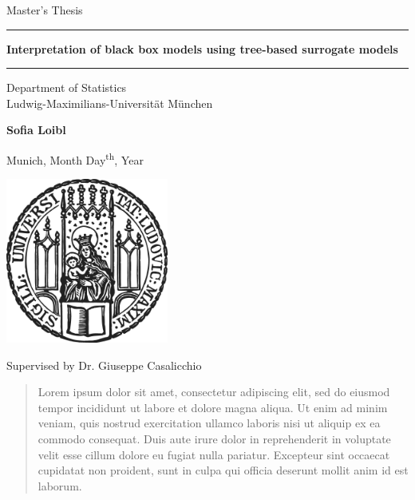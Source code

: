 \documentclass[12pt]{article}
\newcommand{\mytitle}{Interpretation of black box models using tree-based surrogate models}
\newcommand{\myname}{Sofia Loibl}
\newcommand{\mysupervisor}{Dr. Giuseppe Casalicchio}
\begin{document}
 
\begin{titlepage}
\begin{center}
    
\LARGE
Master's Thesis
    
\vspace{0.5cm}
      
\rule{\textwidth}{1.5pt}
\LARGE
\textbf{\mytitle}
\rule{\textwidth}{1.5pt}
   
\vspace{0.5cm}
      
\large
Department of Statistics \\
Ludwig-Maximilians-Universität München 

\vfill

\Large
\textbf{\myname}

\vfill

\large
Munich, Month Day\textsuperscript{th}, Year
      
\vfill

\includegraphics[width = 0.4\textwidth]{sigillum.png}

\vfill

\normalsize
Supervised by \mysupervisor

\end{center}
\end{titlepage}


\newpage

\begin{abstract}

Lorem ipsum dolor sit amet, consectetur adipiscing elit, sed do eiusmod tempor 
incididunt ut labore et dolore magna aliqua. Ut enim ad minim veniam, quis 
nostrud exercitation ullamco laboris nisi ut aliquip ex ea commodo consequat. 
Duis aute irure dolor in reprehenderit in voluptate velit esse cillum dolore eu 
fugiat nulla pariatur. Excepteur sint occaecat cupidatat non proident, sunt in 
culpa qui officia deserunt mollit anim id est laborum.

\end{abstract}
\end{document}
